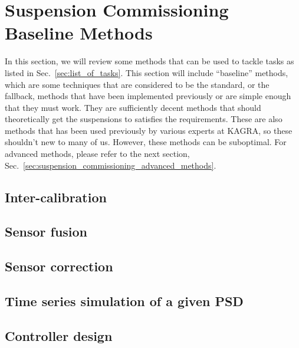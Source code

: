 \section{Suspension Commissioning Baseline Methods \label{sec:suspension_commissioning_baseline_methods}}
In this section, we will review some methods that can be used to tackle tasks as listed in Sec.~\ref{sec:list_of_tasks}.
This section will include ``baseline'' methods, which are some techniques that are considered to be the standard, or the fallback, methods that have been implemented previously or are simple enough that they must work.
They are sufficiently decent methods that should theoretically get the suspensions to satisfies the requirements.
These are also methods that has been used previously by various experts at KAGRA, so these shouldn't new to many of us.
However, these methods can be suboptimal.
For advanced methods, please refer to the next section, Sec.~\ref{sec:suspension_commissioning_advanced_methods}.




\subsection{Inter-calibration}
\subsection{Sensor fusion}
\subsection{Sensor correction}
\subsection{Time series simulation of a given PSD}
\subsection{Controller design}

